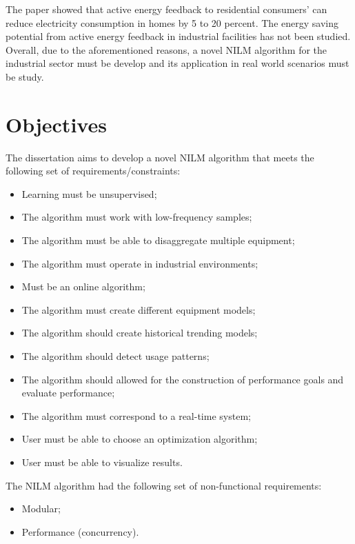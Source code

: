 The paper \cite{Energy_Feedback} showed that active energy feedback to residential consumers' can reduce electricity consumption in homes by 5 to 20 percent. The energy saving potential from active energy feedback in industrial facilities has not been studied. Overall, due to the aforementioned reasons, a novel NILM algorithm for the industrial sector must be develop and its application in real world scenarios must be study.



\section{Objectives}

The dissertation aims to develop a novel NILM algorithm that meets the following set of requirements/constraints:
\begin{itemize}
    \item Learning must be unsupervised;
    \item The algorithm must work with low-frequency samples;
    \item The algorithm must be able to disaggregate multiple equipment;
    \item The algorithm must operate in industrial environments;
    \item Must be an online algorithm;
    \item The algorithm must create different equipment models;
    \item The algorithm should create historical trending models;
    \item The algorithm should detect usage patterns;
    \item The algorithm should allowed for the construction of performance goals and evaluate performance;
    \item The algorithm must correspond to a real-time system;
    \item User must be able to choose an optimization algorithm;
    \item User must be able to visualize results.
\end{itemize}


The NILM algorithm had the following set of non-functional requirements:
\begin{itemize}
    \item Modular;
    \item Performance (concurrency).
\end{itemize}


